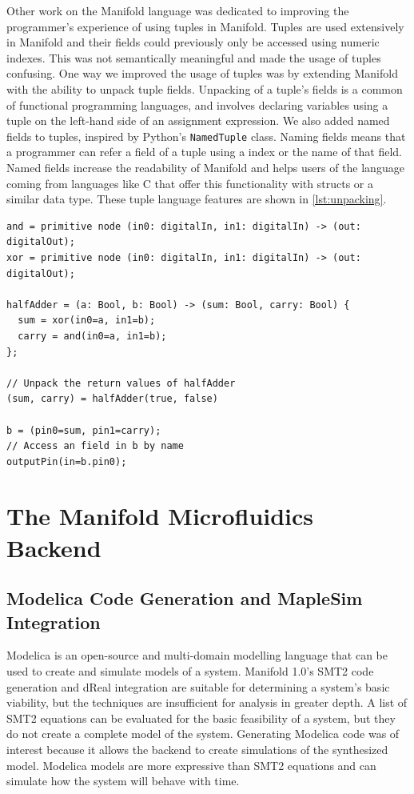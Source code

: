 Other work on the Manifold language was dedicated to improving the programmer's experience of using
tuples in Manifold. Tuples are used extensively in Manifold and their
fields could previously only be accessed using numeric indexes. This was not
semantically meaningful and made the usage of tuples confusing. One way we improved the usage of tuples
was by extending
Manifold with the ability to unpack tuple fields. Unpacking of a tuple's
fields is a common of functional programming languages, and involves declaring
variables using a tuple on the left-hand side of an assignment expression. We
also added named fields to tuples, inspired by Python's \texttt{NamedTuple}
class. Naming fields means that a programmer can refer a field of a tuple using a
index or the name of that field. Named fields increase the readability of
Manifold and helps users of the language coming from languages like C that offer this functionality
with structs or a similar data type. These tuple language features are shown in \autoref{lst:unpacking}.

\begin{lstlisting}[label=lst:unpacking, caption=Examples of new tuple features]
and = primitive node (in0: digitalIn, in1: digitalIn) -> (out: digitalOut);
xor = primitive node (in0: digitalIn, in1: digitalIn) -> (out: digitalOut);

halfAdder = (a: Bool, b: Bool) -> (sum: Bool, carry: Bool) {
  sum = xor(in0=a, in1=b);
  carry = and(in0=a, in1=b);
};

// Unpack the return values of halfAdder
(sum, carry) = halfAdder(true, false)

b = (pin0=sum, pin1=carry);
// Access an field in b by name
outputPin(in=b.pin0);
\end{lstlisting}

\section{The Manifold Microfluidics Backend}

\subsection{Modelica Code Generation and MapleSim Integration}

Modelica is an open-source and multi-domain modelling language that can be used
to create and simulate models of a system. \cite{Maplesim}\cite{modelica}
Manifold 1.0's SMT2 code generation and dReal integration are suitable for
determining a system's basic viability, but the techniques are insufficient for
analysis in greater depth.
A list of SMT2 equations can be evaluated for the basic feasibility of a system, but they do not create
a complete model of the system.
Generating Modelica code was of interest because it allows the backend to create simulations of the
synthesized model.
Modelica models are more expressive than SMT2 equations and can simulate how the system will behave with time.

